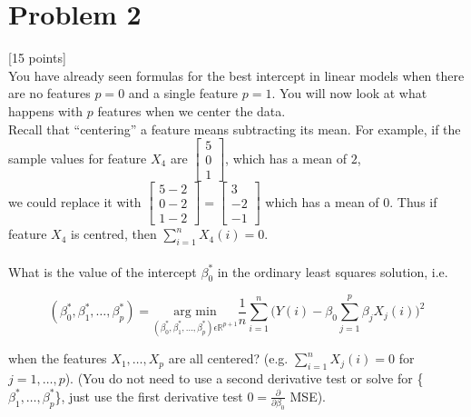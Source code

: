 \documentclass[12pt]{article}
\begin{document}
\section{Problem 2}
 [15 points]\\
You have already seen formulas for the best intercept in linear models when there are no
features $p = 0$ and a single feature $p = 1$. You will now look at what happens with $p$ features
when we center the data.\\
Recall that “centering” a feature means subtracting its mean. For example, if the sample values
for feature $X_4$ are $\begin{bmatrix} 5 \\0\\1\end{bmatrix}$, which has a mean of $2$, \\we could replace it with $\begin{bmatrix} 5 - 2\\0 - 2\\1 - 2\end{bmatrix} = \begin{bmatrix} 3\\-2\\-1\end{bmatrix}$ which has a mean of $0$. Thus if feature $X_4$ is centred, then $\sum^n_{i=1}X_4(i) = 0$.\\\\

What is the value of the intercept $\beta^*_0$ in the ordinary least squares solution, i.e.
\begin{center}
    \[
        (\beta^*_0, \beta^*_1, \dots, \beta^*_p) = \underset{(\beta^*_0, \beta^*_1, \dots, \beta^*_p)\epsilon\mathbb{R}^{p+1}}{\text{arg min}}\frac{1}{n}\sum_{i = 1}^{n} \bigg( Y(i) - \beta_0 \sum_{j=1}^p\beta_jX_j(i)\bigg) ^2
    \]
\end{center}
when the features ${X_1, \dots, X_p}$ are all centered? (e.g. $\sum_{i=1}^nX_j(i) = 0$ for $ j = 1, \dots, p$). (You do not need to use a second derivative test or solve for \{$\beta_1^*, \dots, \beta_p^*$\}, just use the first derivative test $0 = \frac{\partial}{\partial\beta_0}$ MSE).

\end{document}
